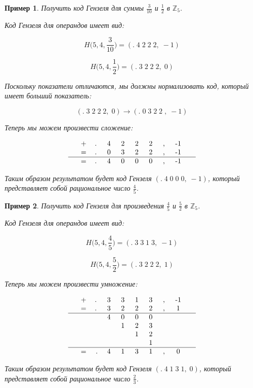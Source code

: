 \documentclass[master, och, diploma, times]{sty/SCWorks}
\theoremstyle{plain}
\newtheorem{exmp}{Пример}[section]
\theoremstyle{definition}
\numberwithin{equation}{section}
\begin{document}
\begin{exmp}
Получить код Гензеля для суммы $\frac{3}{10}$ и $\frac{1}{2}$ в $\mathbb{Z}_5$.

\noindent Код Гензеля для операндов имеет вид:

$$H\bigg(5,4, \frac{3}{10}\bigg)=(.\; 4\; 2\; 2\; 2,\; -1)$$

$$H\bigg(5,4, \frac{1}{2}\bigg)=(.\; 3\; 2\; 2\; 2,\; 0)$$


\noindent Поскольку показатели отличаются, мы должны нормализовать код, который имеет больший показатель:

$$ 
(.\; 3\; 2\; 2\; 2,\; 0) \rightarrow (.\; 0 \; 3\; 2\; 2\; ,\; -1)
$$

\noindent Теперь мы можем произвести сложение:

$$
\begin{tabular}{ccccccccccc}
& + & .\; & 4\; & 2\; & 2\; & 2\; & ,\; & -1\; &  \\
& = & .\; & 0\; & 3\; & 2\; & 2\; & ,\; & -1\; &  \\
\hline
& = & .\; & 4\; & 0\; & 0\; & 0\; & ,\; & -1\; &
\end{tabular}
$$


\noindent Таким образом результатом будет код Гензеля $(.\; 4\; 0\; 0\; 0,\; -1)$, который представляет собой рациональное число $\frac{4}{5}$.
\end{exmp}

\begin{exmp}
Получить код Гензеля для произведения $\frac{4}{5}$ и $\frac{5}{2}$ в $\mathbb{Z}_5$.

\noindent Код Гензеля для операндов имеет вид:

$$H\bigg(5,4, \frac{4}{5}\bigg)=(.\; 3\; 3\; 1\; 3,\; -1)$$

$$H\bigg(5,4, \frac{5}{2}\bigg)=(.\; 3\; 2\; 2\; 2,\; 1)$$

\noindent Теперь мы можем произвести умножение:

$$
\begin{tabular}{cccccccccc}
& + & .\; & 3\; & 3\; & 1\; & 3\; & ,\; & -1\; \\
& = & .\; & 3\; & 2\; & 2\; & 2\; & ,\; & 1\; \\
\hline
& & & 4\; & 0\; & 0\; & 0\; & & & \\
& & & & 1\; & 2\; & 3\; & & & \\
& & & & & 1\; & 2\; & & & \\
& & & & & & 1\; & & & \\
\hline
& = & . & 4\; & 1\; & 3\; & 1\; & ,\; & 0\; &
\end{tabular}
$$


\noindent Таким образом результатом будет код Гензеля $(.\; 4\; 1\; 3\; 1,\; 0)$, который представляет собой рациональное число $\frac{2}{3}$.
\end{exmp}
\end{document}
